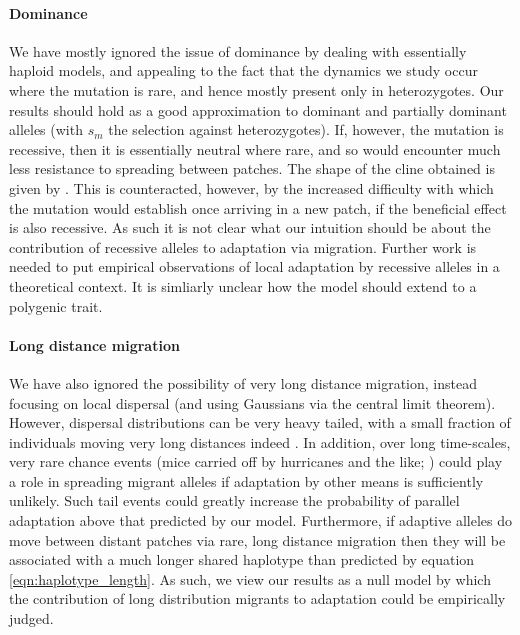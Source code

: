 \documentclass{article}
\newcommand{\citep}[1]{\cite{#1}}
\newcommand{\citet}[1]{\cite{#1}}
\begin{document}
\paragraph{Dominance}
We have mostly ignored the issue of dominance 
by dealing with essentially haploid models,
and appealing to the fact that the dynamics we study occur where the mutation is rare,
and hence mostly present only in heterozygotes. 
Our results should hold as a good approximation to dominant and partially dominant alleles
(with $s_m$ the selection against heterozygotes).
If, however, the mutation is recessive, then it is essentially neutral where rare,
and so would encounter much less resistance to spreading between patches.
The shape of the cline obtained is given by \citet{haldane1948theory}.
This is counteracted, however, by the increased difficulty with which the mutation would establish
once arriving in a new patch,
if the beneficial effect is also recessive. 
As such it is not clear what our intuition should be 
about the contribution of recessive alleles to adaptation via migration. 
Further work is needed to put empirical observations of local adaptation by recessive alleles 
in a theoretical context.
It is simliarly unclear how the model should extend to a polygenic trait.

\paragraph{Long distance migration}
We have also ignored the possibility of very long distance migration,
instead focusing on local dispersal (and using Gaussians via the central limit theorem).
However, dispersal distributions can be very heavy tailed, 
with a small fraction of individuals moving very long distances indeed \citep{levin2003ecology,reynolds2009levy}.
In addition, over long time-scales, very rare chance events (mice carried off by hurricanes and the like; \citet{censky1998overwater,nathan2008mechanisms})
could play a role in spreading migrant alleles if adaptation by other means is sufficiently unlikely.
Such tail events could greatly increase the probability of parallel adaptation above that predicted by our model. 
Furthermore, if adaptive alleles do move between distant patches via rare, long distance migration 
then they will be associated with a much longer shared haplotype than predicted by equation \eqref{eqn:haplotype_length}. 
As such, we view our results as a null model by which the contribution of long distribution migrants to adaptation could be empirically judged.   
\end{document}
